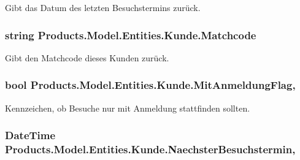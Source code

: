 Gibt das Datum des letzten Besuchstermins zurück. 

\subsubsection[{\texorpdfstring{Matchcode}{Matchcode}}]{\setlength{\rightskip}{0pt plus 5cm}string Products.\+Model.\+Entities.\+Kunde.\+Matchcode\hspace{0.3cm}{\ttfamily [get]}}\hypertarget{class_products_1_1_model_1_1_entities_1_1_kunde_a7ec637ef2ac0da91f1be956673442ff2}{}\label{class_products_1_1_model_1_1_entities_1_1_kunde_a7ec637ef2ac0da91f1be956673442ff2}


Gibt den Matchcode dieses Kunden zurück. 

\subsubsection[{\texorpdfstring{Mit\+Anmeldung\+Flag}{MitAnmeldungFlag}}]{\setlength{\rightskip}{0pt plus 5cm}bool Products.\+Model.\+Entities.\+Kunde.\+Mit\+Anmeldung\+Flag\hspace{0.3cm}{\ttfamily [get]}, {\ttfamily [set]}}\hypertarget{class_products_1_1_model_1_1_entities_1_1_kunde_ac4e2d0ce4a1eaa62807bf430a784d815}{}\label{class_products_1_1_model_1_1_entities_1_1_kunde_ac4e2d0ce4a1eaa62807bf430a784d815}


Kennzeichen, ob Besuche nur mit Anmeldung stattfinden sollten. 

\subsubsection[{\texorpdfstring{Naechster\+Besuchstermin}{NaechsterBesuchstermin}}]{\setlength{\rightskip}{0pt plus 5cm}Date\+Time Products.\+Model.\+Entities.\+Kunde.\+Naechster\+Besuchstermin\hspace{0.3cm}{\ttfamily [get]}, {\ttfamily [set]}}\hypertarget{class_products_1_1_model_1_1_entities_1_1_kunde_a630357deb496eb0e1a639e4594363e61}{}\label{class_products_1_1_model_1_1_entities_1_1_kunde_a630357deb496eb0e1a639e4594363e61}


